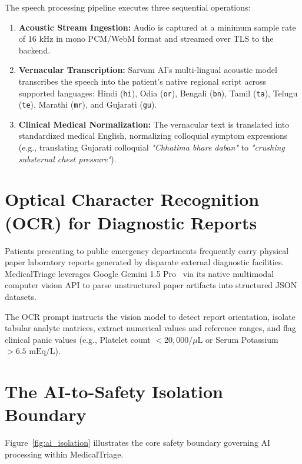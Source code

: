 \documentclass[11pt,a4paper,oneside]{report}
\begin{document}
The speech processing pipeline executes three sequential operations:
\begin{enumerate}[leftmargin=20pt]
  \item \textbf{Acoustic Stream Ingestion:} Audio is captured at a minimum sample rate of 16 kHz in mono PCM/WebM format and streamed over TLS to the backend.
  \item \textbf{Vernacular Transcription:} Sarvam AI's multi-lingual acoustic model transcribes the speech into the patient's native regional script across supported languages: Hindi (\texttt{hi}), Odia (\texttt{or}), Bengali (\texttt{bn}), Tamil (\texttt{ta}), Telugu (\texttt{te}), Marathi (\texttt{mr}), and Gujarati (\texttt{gu}).
  \item \textbf{Clinical Medical Normalization:} The vernacular text is translated into standardized medical English, normalizing colloquial symptom expressions (e.g., translating Gujarati colloquial \textit{"Chhatima bhare daban"} to \textit{"crushing substernal chest pressure"}).
\end{enumerate}

\section{Optical Character Recognition (OCR) for Diagnostic Reports}
Patients presenting to public emergency departments frequently carry physical paper laboratory reports generated by disparate external diagnostic facilities. MedicalTriage leverages Google Gemini 1.5 Pro~\cite{gemini2023} via its native multimodal computer vision API to parse unstructured paper artifacts into structured JSON datasets.

The OCR prompt instructs the vision model to detect report orientation, isolate tabular analyte matrices, extract numerical values and reference ranges, and flag clinical panic values (e.g., Platelet count $< 20,000/\mu\text{L}$ or Serum Potassium $> 6.5\text{ mEq/L}$).

\section{The AI-to-Safety Isolation Boundary}
Figure~\ref{fig:ai_isolation} illustrates the core safety boundary governing AI processing within MedicalTriage.
\end{document}
